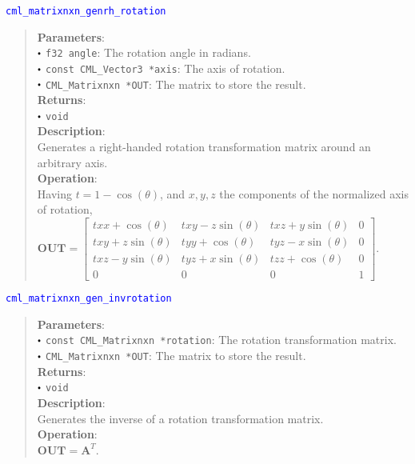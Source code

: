 \documentclass[a4paper,oneside,8pt]{extarticle}
\newcommand{\function}[1]{
  \noindent\textcolor{blue}{\texttt{#1}}
  \vspace{-0.3em}
}
\renewcommand{\dot}{\raisebox{0.3ex}{\scalebox{0.6}{$\bullet$}}}
\theoremstyle{definition}
\begin{document}
\function{cml\_matrixnxn\_genrh\_rotation}
\begin{quote}
  \textbf{Parameters}: \\
  $\dot$ \texttt{f32 angle}: The rotation angle in radians. \\
  $\dot$ \texttt{const CML\_Vector3 *axis}: The axis of rotation. \\
  $\dot$ \texttt{CML\_Matrixnxn *OUT}: The matrix to store the result. \\
  \textbf{Returns}: \\
  $\dot$ \texttt{void} \\

  \vspace{-0.75em}
  \textbf{Description}: \\
  Generates a right-handed rotation transformation matrix around an arbitrary axis. \\

  \vspace{-0.75em}
  \textbf{Operation}: \\
  Having $t = 1 - \cos(\theta)$, and $x,y,z$ the components of the normalized axis of rotation, $\mathbf{OUT} = \begin{bmatrix}
  txx + \cos(\theta) & txy - z\sin(\theta) & txz + y\sin(\theta) & 0 \\
  txy + z\sin(\theta) & tyy + \cos(\theta) & tyz - x\sin(\theta) & 0 \\
  txz - y\sin(\theta) & tyz + x\sin(\theta) & tzz + \cos(\theta) & 0 \\
  0 & 0 & 0 & 1
  \end{bmatrix}$. \\
\end{quote}

\function{cml\_matrixnxn\_gen\_invrotation}
\begin{quote}
  \textbf{Parameters}: \\
  $\dot$ \texttt{const CML\_Matrixnxn *rotation}: The rotation transformation matrix. \\
  $\dot$ \texttt{CML\_Matrixnxn *OUT}: The matrix to store the result. \\
  \textbf{Returns}: \\
  $\dot$ \texttt{void} \\

  \vspace{-0.75em}
  \textbf{Description}: \\
  Generates the inverse of a rotation transformation matrix. \\

  \vspace{-0.75em}
  \textbf{Operation}: \\
  $\mathbf{OUT} = \mathbf{A}^T$. \\
\end{quote}
\end{document}
